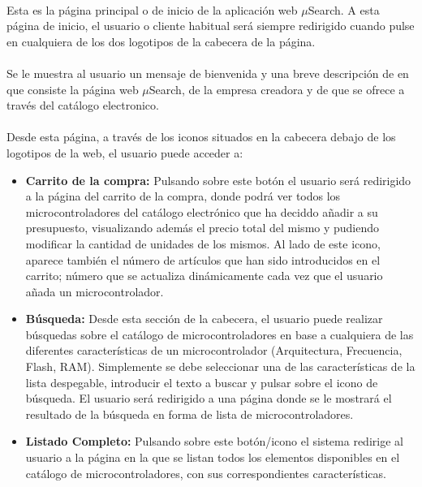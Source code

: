 \paragraph{}Esta es la página principal o de inicio de la aplicación web $\mu$Search. A esta página de inicio, el usuario o cliente habitual será siempre redirigido cuando pulse en cualquiera de los dos logotipos de la cabecera de la página.

\paragraph{}Se le muestra al usuario un mensaje de bienvenida y una breve descripción de en que consiste la página web $\mu$Search, de la empresa creadora y de que se ofrece a través del catálogo electronico.

\paragraph{}Desde esta página, a través de los iconos situados en la cabecera debajo de los logotipos de la web, el usuario puede acceder a:
\begin{itemize}
	\item\textbf{Carrito de la compra:} Pulsando sobre este botón el usuario será redirigido a la página del carrito de la compra, donde podrá ver todos los microcontroladores del catálogo electrónico que ha deciddo añadir a su presupuesto, visualizando además el precio total del mismo y pudiendo modificar la cantidad de unidades de los mismos.
	Al lado de este icono, aparece también el número de artículos que han sido introducidos en el carrito; número que se actualiza dinámicamente cada vez que el usuario añada un microcontrolador.
	
	\item \textbf{Búsqueda:} Desde esta sección de la cabecera, el usuario puede realizar búsquedas sobre el catálogo de microcontroladores en base a cualquiera de las diferentes características de un microcontrolador (Arquitectura, Frecuencia, Flash, RAM). Simplemente se debe seleccionar una de las características de la lista despegable, introducir el texto a buscar y pulsar sobre el icono de búsqueda.
	El usuario será redirigido a una página donde se le mostrará el resultado de la búsqueda en forma de lista de microcontroladores.
	
	\item \textbf{Listado Completo:} Pulsando sobre este botón/icono el sistema redirige al usuario a la página en la que se listan todos los elementos disponibles en el catálogo de microcontroladores, con sus correspondientes características.
	
\end{itemize}